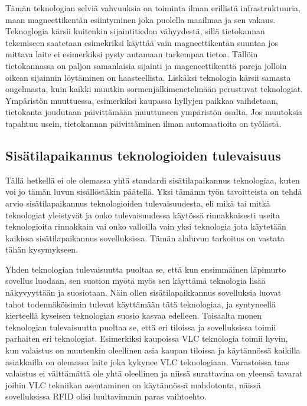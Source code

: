 Tämän teknologian selviä vahvuuksia on toiminta ilman erillistä infrastruktuuria, maan magneettikentän esiintyminen joka puolella maailmaa ja sen vakaus\cite{magneetti}. Teknoglogia kärsii kuitenkin sijaintitiedon vähyydestä, sillä tietokannan tekemiseen saatetaan esimekriksi käyttää vain magneettikentän suuntaa jos mittava laite ei esimerkiksi pysty antamaan tarkempaa tietoa\cite{magneetti}. Tällöin tietokannassa on paljon samanlaisia sijainti ja mageneettikenttä pareja jolloin oikean sijainnin löytäminen on haasteellista. Liskäksi teknologia kärsii samasta ongelmasta, kuin kaikki muutkin sormenjälkimenetelmään perustuvat teknologiat. Ympäristön muuttuessa, esimerkiksi kaupassa hyllyjen paikkaa vaihdetaan, tietokanta joudutaan päivittämään muuttuneen ympäristön osalta. Jos muutoksia tapahtuu usein, tietokannan päivittäminen ilman automaatioita on työlästä.

\subsection{Sisätilapaikannus teknologioiden tulevaisuus}
Tällä hetkellä ei ole olemassa yhtä standardi sisätilapaikannus teknologiaa, kuten voi jo tämän luvun sisällöstäkin päätellä. Yksi tämämn työn tavoitteista on tehdä arvio sisätilapaikannus teknologioiden tulevaisuudesta, eli mikä tai mitkä teknologiat yleistyvät ja onko tulevaisuudessa käytössä rinnakkaisesti useita teknologioita rinnakkain vai onko valloilla vain yksi teknologia jota käytetään kaikissa sisätilapaikannus sovelluksissa. Tämän alaluvun tarkoitus on vastata tähän kysymykseen.

Yhden teknologian tulevaisuutta puoltaa se, että kun ensimmäinen läpimurto sovellus luodaan, sen suosion myötä myös sen käyttämä teknologia lisää näkyvyyttään ja suosiotaan. Näin ollen sisätilapaikkannus sovelluksia luovat tahot todennäköisimin tulevat käyttämään tätä teknologiaa, ja syntyneellä kierteellä kyseisen teknologian suosio kasvaa edelleen. Toisaalta monen teknologian tulevaisuutta puoltaa se, että eri tiloissa ja sovelluksissa toimii parhaiten eri teknologiat. Esimerkiksi kaupoissa VLC teknologia toimii hyvin, kun valaistus on muutenkin oleellinen asia kaupan tiloissa ja käytännössä kaikilla asiakkailla on olemassa laite joka kykynee VLC teknologiaan. Varastoissa taas valaistus ei välttämättä ole yhtä oleellinen ja niissä surattavina on yleensä tavarat joihin VLC tekniikan asentaminen on käytännössä mahdotonta, näissä sovelluksissa RFID olisi luultavimmin paras vaihtoehto.


